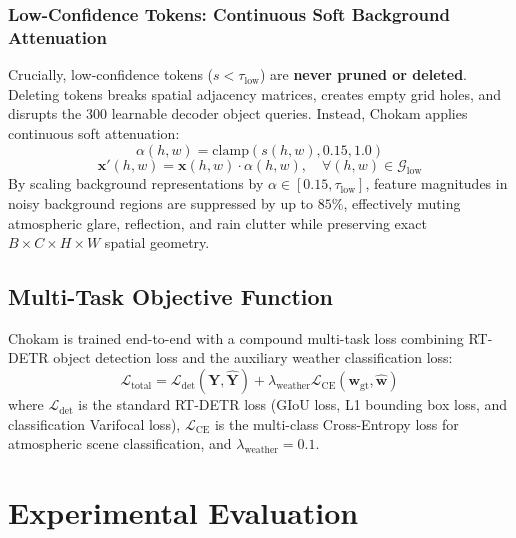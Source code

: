 \documentclass[conference]{IEEEtran}
\begin{document}
\subsubsection{Low-Confidence Tokens: Continuous Soft Background Attenuation}
Crucially, low-confidence tokens ($s < \tau_{\text{low}}$) are \textbf{never pruned or deleted}. Deleting tokens breaks spatial adjacency matrices, creates empty grid holes, and disrupts the 300 learnable decoder object queries. Instead, Chokam applies continuous soft attenuation:
\begin{equation}
\alpha(h, w) = \text{clamp}(s(h, w), 0.15, 1.0)
\end{equation}
\begin{equation}
\mathbf{x}'(h, w) = \mathbf{x}(h, w) \cdot \alpha(h, w), \quad \forall (h, w) \in \mathcal{G}_{\text{low}}
\end{equation}
By scaling background representations by $\alpha \in [0.15, \tau_{\text{low}}]$, feature magnitudes in noisy background regions are suppressed by up to $85\%$, effectively muting atmospheric glare, reflection, and rain clutter while preserving exact $B \times C \times H \times W$ spatial geometry.

\subsection{Multi-Task Objective Function}
Chokam is trained end-to-end with a compound multi-task loss combining RT-DETR object detection loss and the auxiliary weather classification loss:
\begin{equation}
\mathcal{L}_{\text{total}} = \mathcal{L}_{\text{det}}(\mathbf{Y}, \hat{\mathbf{Y}}) + \lambda_{\text{weather}} \mathcal{L}_{\text{CE}}(\mathbf{w}_{\text{gt}}, \hat{\mathbf{w}})
\end{equation}
where $\mathcal{L}_{\text{det}}$ is the standard RT-DETR loss (GIoU loss, L1 bounding box loss, and classification Varifocal loss), $\mathcal{L}_{\text{CE}}$ is the multi-class Cross-Entropy loss for atmospheric scene classification, and $\lambda_{\text{weather}} = 0.1$.

\section{Experimental Evaluation}
\end{document}
